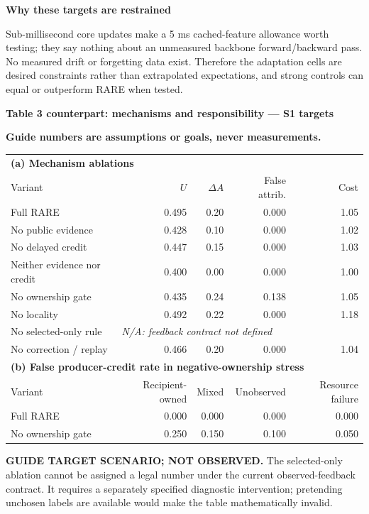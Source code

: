 \documentclass[10pt,a4paper]{article}
\newcommand{\status}{\textcolor{red!70!black}{\textbf{Guide numbers are assumptions or goals, never measurements.}}}
\newcommand{\lead}[1]{\vspace{4pt}\textbf{#1}\par}
\begin{document}
\lead{Why these targets are restrained}
Sub-millisecond core updates make a 5 ms cached-feature allowance worth testing;
they say nothing about an unmeasured backbone forward/backward pass. No measured
drift or forgetting data exist. Therefore the adaptation cells are desired
constraints rather than extrapolated expectations, and strong controls can
equal or outperform RARE when tested.

\clearpage
\lead{Table 3 counterpart: mechanisms and responsibility --- S1 targets}
\status
\begin{center}\small
\begin{tabular}{@{}lrrrr@{}}\toprule
\multicolumn{5}{l}{\textbf{(a) Mechanism ablations}}\\
Variant & $U$ & $\Delta A$ & False attrib. & Cost\\\midrule
Full RARE & 0.495 & 0.20 & 0.000 & 1.05\\
No public evidence & 0.428 & 0.10 & 0.000 & 1.02\\
No delayed credit & 0.447 & 0.15 & 0.000 & 1.03\\
Neither evidence nor credit & 0.400 & 0.00 & 0.000 & 1.00\\
No ownership gate & 0.435 & 0.24 & 0.138 & 1.05\\
No locality & 0.492 & 0.22 & 0.000 & 1.18\\
No selected-only rule & \multicolumn{4}{l}{\textit{N/A: feedback contract not defined}}\\
No correction / replay & 0.466 & 0.20 & 0.000 & 1.04\\
\midrule
\multicolumn{5}{l}{\textbf{(b) False producer-credit rate in negative-ownership stress}}\\
Variant & Recipient-owned & Mixed & Unobserved & Resource failure\\\midrule
Full RARE & 0.000 & 0.000 & 0.000 & 0.000\\
No ownership gate & 0.250 & 0.150 & 0.100 & 0.050\\
\bottomrule\end{tabular}\end{center}
\textbf{GUIDE TARGET SCENARIO; NOT OBSERVED.} The selected-only ablation cannot
be assigned a legal number under the current observed-feedback contract. It
requires a separately specified diagnostic intervention; pretending unchosen
labels are available would make the table mathematically invalid.
\end{document}
